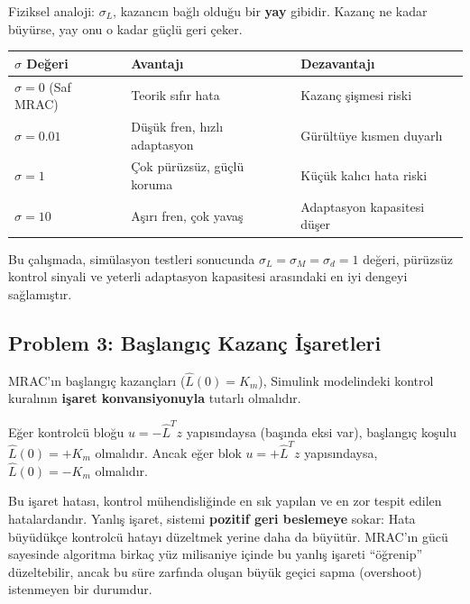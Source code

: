 \documentclass[12pt,a4paper]{article}
\begin{document}
Fiziksel analoji: $\sigma_L$, kazancın bağlı olduğu bir \textbf{yay} gibidir. Kazanç ne kadar büyürse, yay onu o kadar güçlü geri çeker.

\begin{kavram}
\begin{center}
\begin{tabular}{lll}
\toprule
\textbf{$\sigma$ Değeri} & \textbf{Avantajı} & \textbf{Dezavantajı} \\
\midrule
$\sigma = 0$ (Saf MRAC) & Teorik sıfır hata & Kazanç şişmesi riski \\
$\sigma = 0.01$ & Düşük fren, hızlı adaptasyon & Gürültüye kısmen duyarlı \\
$\sigma = 1$ & Çok pürüzsüz, güçlü koruma & Küçük kalıcı hata riski \\
$\sigma = 10$ & Aşırı fren, çok yavaş & Adaptasyon kapasitesi düşer \\
\bottomrule
\end{tabular}
\end{center}
\end{kavram}

Bu çalışmada, simülasyon testleri sonucunda $\sigma_L = \sigma_M = \sigma_d = 1$ değeri, pürüzsüz kontrol sinyali ve yeterli adaptasyon kapasitesi arasındaki en iyi dengeyi sağlamıştır.

\subsection{Problem 3: Başlangıç Kazanç İşaretleri}
\label{subsec:sign}

MRAC'ın başlangıç kazançları ($\hat{L}(0) = K_m$), Simulink modelindeki kontrol kuralının \textbf{işaret konvansiyonuyla} tutarlı olmalıdır.

Eğer kontrolcü bloğu $u = -\hat{L}^T z$ yapısındaysa (başında eksi var), başlangıç koşulu $\hat{L}(0) = +K_m$ olmalıdır. Ancak eğer blok $u = +\hat{L}^T z$ yapısındaysa, $\hat{L}(0) = -K_m$ olmalıdır.

\begin{dikkat}
Bu işaret hatası, kontrol mühendisliğinde en sık yapılan ve en zor tespit edilen hatalardandır. Yanlış işaret, sistemi \textbf{pozitif geri beslemeye} sokar: Hata büyüdükçe kontrolcü hatayı düzeltmek yerine daha da büyütür. MRAC'ın gücü sayesinde algoritma birkaç yüz milisaniye içinde bu yanlış işareti ``öğrenip'' düzeltebilir, ancak bu süre zarfında oluşan büyük geçici sapma (overshoot) istenmeyen bir durumdur.
\end{dikkat}
\end{document}
